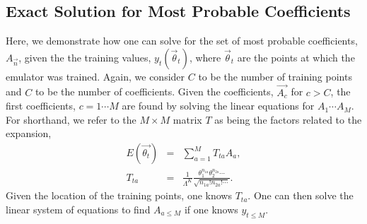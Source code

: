 \documentclass[UserManual.tex]{subfiles}
\begin{document}
\subsection{Exact Solution for Most Probable Coefficients}

Here, we demonstrate how one can solve for the set of most probable coefficients, $A_{\vec{n}}$, given the the training values, $y_t(\vec{\theta}_t)$, where $\vec{\theta}_t$ are the points at which the emulator was trained. Again, we consider $C$ to be the number of training points and $C$ to be the number of coefficients. Given the coefficients, $\vec{A_c}$ for $c>C$, the first coefficients, $c=1\cdots M$ are found by solving the linear equations for $A_1\cdots A_M$. For shorthand, we refer to the $M\times M$ matrix $T$ as being the factors related to the expansion,
\begin{eqnarray}
E(\vec{\theta_t})&=&\sum_{a=1}^M T_{ta} A_a,\\
\nonumber
T_{ta}&=&\frac{1}{\Lambda^K}\frac{\theta_1^{n_{1a}}\theta_2^{n_{2a}}\cdots}{\sqrt{n_{1a}!n_{2a}!\cdots}}.
\end{eqnarray}
Given the location of the training points, one knows $T_{ta}$. One can then solve the linear system of equations to find $A_{a\le M}$ if one knows $y_{t\le M}$. 
\end{document}

